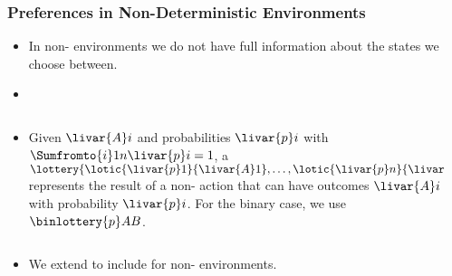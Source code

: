 \documentclass[notes,mh]{mikoslides}
\begin{document}
\begin{module}[id=preferences]
\begin{frame}
  \frametitle{Preferences in Non-Deterministic Environments}
  \begin{itemize}
  \item
    \begin{omtext}[title=Problem]
      In non- environments we do not have full information
      about the states we choose between.
    \end{omtext}
  \item
    \begin{example}[title=Airline Food]
    \end{example}
  \item 
    \begin{definition}
      \begin{columns}
        \begin{column}{7cm}
          Given  $\livar{A}i$ and probabilities $\livar{p}i$ with
          $\Sumfromto{i}1n{\livar{p}i}=1$, a 
          $\lottery{\lotic{\livar{p}1}{\livar{A}1},\ldots,\lotic{\livar{p}n}{\livar{A}n}}$
          represents the result of a non- action that can
          have outcomes $\livar{A}i$ with probability $\livar{p}i$. For the binary case,
          we use $\binlottery{p}AB$.
        \end{column}\qquad
        \begin{column}{3cm}
        \end{column}
      \end{columns}
    \end{definition}
  \item We extend  to include  for
    non- environments.
  \end{itemize}
\end{frame}
\end{module}
\end{document}
